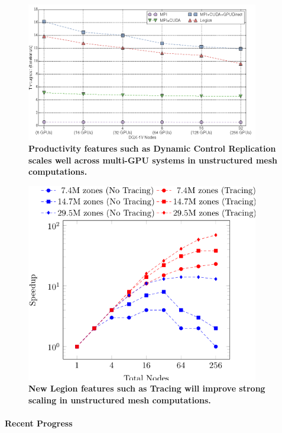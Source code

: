 \begin{figure}[htb]
  \centering
  \includegraphics[width=4in]{projects/2.3.6-NNSA/2.3.6.01-LANL-ATDM/control-replication-performance}
        \caption{\label{fig:control-replication-performance}\textbf{Productivity features such as Dynamic Control Replication scales well across multi-GPU systems in unstructured mesh computations.}}
\end{figure}

\begin{figure}[htb]
        \centering
        \includegraphics[width=4in]{projects/2.3.6-NNSA/2.3.6.01-LANL-ATDM/tracing-performance}
        \caption{\label{fig:tracing-performance}\textbf{New Legion features such as Tracing will improve strong scaling in unstructured mesh computations.}}
\end{figure}

\paragraph{Recent Progress} \leavevmode \\



